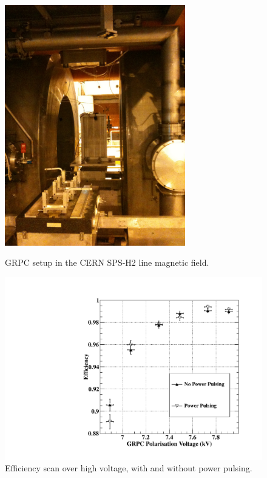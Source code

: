 \begin{figure}
    \centering
 \begin{minipage}[t]{0.45\textwidth}
 \includegraphics*[width=0.7\textwidth,keepaspectratio]{Calorimeter/SDHCAL_GRPC/figures/BeamLine.jpg}
	\caption{GRPC setup in the CERN SPS-H2 line magnetic field.}
 \label{fig:Calorimeter:SDHCAL_GRPC:PP1}
 \end{minipage}
 \hfill
 \begin{minipage}[t]{0.45\textwidth}
 \includegraphics*[width=\textwidth,keepaspectratio]{Calorimeter/SDHCAL_GRPC/figures/BField_Efficiency_PowerPulsed.pdf}
 \caption{Efficiency scan over high voltage, with and without power pulsing. }
 \label{fig:Calorimeter:SDHCAL_GRPC:PP2}
 \end{minipage}
 \end{figure}

